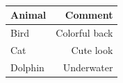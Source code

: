 \documentclass[11pt, a4paper]{article}
\begin{document}
\begin{example}
\begin{gridlayout}{\textwidth}{11cm}
\begin{row}{0.3}
\begin{cell}{0.3}
            \end{cell}
            \begin{cell}{0.05}
                ~
            \end{cell}
            \begin{cell}{0.3}
                \centering
                \vspace{1em}
                \begin{tabular}{lr}
                    \toprule
                    Animal & Comment \\
                    \midrule
                    Bird & Colorful back \\
                    Cat & Cute look \\
                    Dolphin & Underwater \\
                    \bottomrule
                \end{tabular}
            \end{cell}
        \end{row}
    \end{gridlayout}
\end{example}


\end{document}
